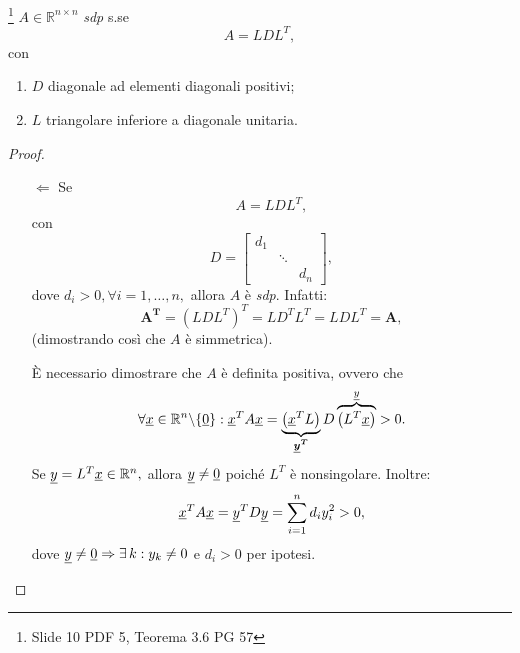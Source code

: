 \begin{theorem}\label{th:matrice_SDP_sse_LDL}\footnote{Slide 10 PDF 5, Teorema 3.6 PG 57}
    $A\in\mathbb{R}^{n\times n}$ \textit{sdp} s.se \begin{equation}\label{eq:A=LDL}
        A=LDL^T,
    \end{equation} con
    \begin{enumerate}
        \item $D$ diagonale ad elementi diagonali positivi;
        \item $L$ triangolare inferiore a diagonale unitaria.
    \end{enumerate}
\end{theorem}
\begin{proof}
    \begin{itemize}
        \item[$\Leftarrow$] Se
        \begin{equation*}
            A=LDL^T,
        \end{equation*}
        con
        \begin{equation*}
        	D=
        	\begin{bmatrix}
        		d_1\\
        		&\ddots\\
        		& & d_n
        	\end{bmatrix},
        \end{equation*}
        dove $d_i>0,\forall i=1,\hdots,n,$ allora $A$ è \textit{sdp}. Infatti:
        \begin{equation*}
            \boldsymbol{A^T}=\left(LDL^T\right)^T=LD^TL^T=LDL^T=\boldsymbol A,
        \end{equation*}
        (dimostrando così che $A$ è simmetrica).
        
        È necessario dimostrare che $A$ è definita positiva, ovvero che
        \begin{equation*}
            \forall\uline x\in\mathbb R^n\backslash\{\uline 0\}: \uline x^T A \uline x = \underbrace{\left(\uline x^TL\right)}_{\boldsymbol{\uline y^T}}D\overbrace{\left(L^T\uline x\right)}^{\uline y}>0.
        \end{equation*}
        Se $\uline y=L^T\uline x\in\mathbb R^n,$ allora $\uline y\neq \uline 0$ poiché $L^T$ è \gls{nonsingolare}. Inoltre:
        \begin{equation*}
            \uline x^TA\uline x=\uline y^TD\uline y=\sum_{i=1}^n d_iy_i^2>0,
        \end{equation*}
         dove $\uline y\neq\uline 0\Rightarrow\exists\, k:y_k\neq 0$ e $d_i>0$ per ipotesi.
         

\end{itemize}
\end{proof}
